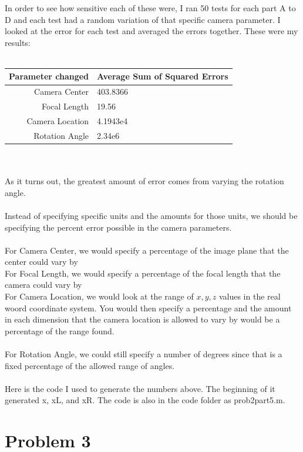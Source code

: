 \documentclass[11pt,psfig]{article}
\begin{document}
In order to see how sensitive each of these were, I ran 50 tests for each part A to D and each test had a random variation of that specific camera parameter. I looked at the error for each test and averaged the errors together. These were my results:\\
\\
\begin{tabular}{ r |l }
Parameter changed & Average Sum of Squared Errors\\
  \hline                       
  Camera Center & 403.8366  \\
  Focal Length & 19.56 \\
  Camera Location & 4.1943e4 \\
  Rotation Angle & 2.34e6
\end{tabular}
\\
\\
As it turns out, the greatest amount of error comes from varying the rotation angle. \\
\\
Instead of specifying specific units and the amounts for those units, we should be specifying the percent error possible in the camera parameters. \\
\\
For Camera Center, we would specify a percentage of the image plane that the center could vary by\\
For Focal Length, we would specify a percentage of the focal length that the camera could vary by\\
For Camera Location, we would look at the range of $x,y,z$ values in the real woord coordinate system. You would then specify a percentage and the amount in each dimension that the camera location is allowed to vary by would be a percentage of the range found.\\
\\
For Rotation Angle, we could still specify a number of degrees since that is a fixed percentage of the allowed range of angles.\\
\\
Here is the code I used to generate the numbers above. The beginning of it generated x, xL, and xR. The code is also in the code folder as prob2part5.m.


\newpage


\section*{Problem 3}
\end{document}
